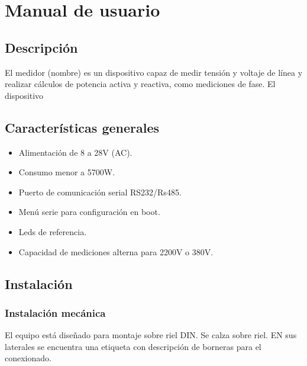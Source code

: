 
\chapter{Manual de usuario} %

\label{AppendixA} %


\section{Descripción}
El medidor (nombre) es un dispositivo capaz de medir tensión y voltaje de línea y realizar cálculos de potencia activa y reactiva, como mediciones de fase. El dispositivo

\section{Características generales}

\begin{itemize}
\item Alimentación de 8 a 28V (AC).
\item Consumo menor a 5700W.
\item Puerto de comunicación serial RS232/Rs485.
\item Menú serie para configuración en boot.
\item Leds de referencia.
\item Capacidad de mediciones alterna para  2200V o 380V.
\end{itemize}


\section{Instalación}

\subsection{Instalación mecánica}

El equipo está diseñado para montaje sobre riel DIN. Se calza sobre riel. EN sus laterales se encuentra una etiqueta con descripción de borneras para el conexionado.


